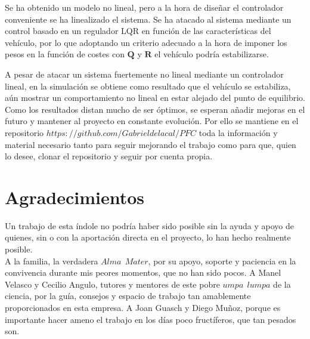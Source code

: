 \documentclass[twoside,11pt]{book}
\begin{document}
Se ha obtenido un modelo no lineal, pero a la hora de diseñar el controlador conveniente se ha  linealizado el sistema. Se ha atacado al sistema mediante un control basado en un regulador LQR en función de las características del vehículo, por lo que adoptando un criterio adecuado a la hora de imponer los pesos en la función de costes con $\mathbf{Q}$ y $\mathbf{R}$ el vehículo podría estabilizarse.

A pesar de atacar un sistema fuertemente no lineal mediante un controlador lineal, en la simulación se obtiene como resultado que el vehículo se estabiliza, aún mostrar un comportamiento no lineal en estar alejado del punto de equilibrio. \\

Como los resultados distan mucho de ser óptimos, se esperan añadir mejoras en el futuro y mantener al proyecto en constante evolución. Por ello se mantiene en el repositorio  $https://github.com/Gabrieldelacal/PFC$ toda la información y material necesario tanto para seguir mejorando el trabajo como para que, quien lo desee, clonar el repositorio y seguir por cuenta propia.

\newpage

\chapter*{Agradecimientos}

Un trabajo de esta índole no podría haber sido posible sin la ayuda y apoyo de quienes, sin o con la aportación directa en el proyecto, lo han hecho realmente posible. \\

A la familia, la verdadera $Alma\>\>Mater$, por su apoyo,  soporte y paciencia en la convivencia durante mis peores momentos, que no han sido pocos. A Manel Velasco y Cecilio Angulo, tutores y mentores de este pobre $umpa\>\>lumpa$ de la ciencia, por la guía, consejos y espacio de trabajo tan amablemente proporcionados en esta empresa. A Joan Guasch y Diego Muñoz, porque es importante hacer ameno el trabajo en los días poco fructíferos, que tan pesados son. 

\newpage
\end{document}
